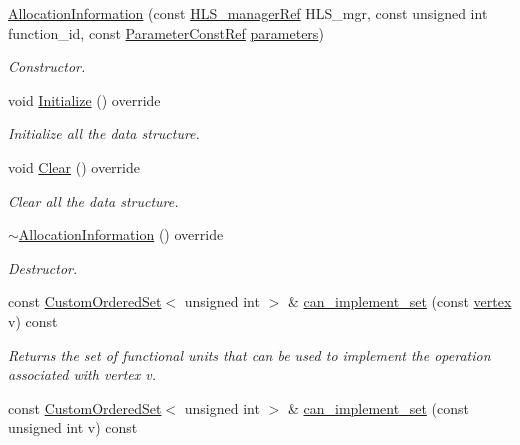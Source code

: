 \begin{DoxyCompactItemize}
\item 
\hyperlink{classAllocationInformation_a234060bfc4ac6212fd26241260ffc1d8}{Allocation\+Information} (const \hyperlink{hls__manager_8hpp_acd3842b8589fe52c08fc0b2fcc813bfe}{H\+L\+S\+\_\+manager\+Ref} H\+L\+S\+\_\+mgr, const unsigned int function\+\_\+id, const \hyperlink{Parameter_8hpp_a37841774a6fcb479b597fdf8955eb4ea}{Parameter\+Const\+Ref} \hyperlink{classIntermediateRepresentation_a1dec82655a3ccf5023a1d3bb9805ce8c}{parameters})
\begin{DoxyCompactList}\small\item\em Constructor. \end{DoxyCompactList}\item 
void \hyperlink{classAllocationInformation_ad1263fb5b76f2dd97daacfcf3012f3e4}{Initialize} () override
\begin{DoxyCompactList}\small\item\em Initialize all the data structure. \end{DoxyCompactList}\item 
void \hyperlink{classAllocationInformation_a2a8dda2a075950424083d9aff01267fe}{Clear} () override
\begin{DoxyCompactList}\small\item\em Clear all the data structure. \end{DoxyCompactList}\item 
\hyperlink{classAllocationInformation_a102ad3015bf873da2b0c35280849f727}{$\sim$\+Allocation\+Information} () override
\begin{DoxyCompactList}\small\item\em Destructor. \end{DoxyCompactList}\item 
const \hyperlink{classCustomOrderedSet}{Custom\+Ordered\+Set}$<$ unsigned int $>$ \& \hyperlink{classAllocationInformation_a070bb1c2f0116dd33cca59346ee57372}{can\+\_\+implement\+\_\+set} (const \hyperlink{graph_8hpp_abefdcf0544e601805af44eca032cca14}{vertex} v) const
\begin{DoxyCompactList}\small\item\em Returns the set of functional units that can be used to implement the operation associated with vertex v. \end{DoxyCompactList}\item 
const \hyperlink{classCustomOrderedSet}{Custom\+Ordered\+Set}$<$ unsigned int $>$ \& \hyperlink{classAllocationInformation_aa232c85d830198cd536e5c38135f75b8}{can\+\_\+implement\+\_\+set} (const unsigned int v) const

\end{DoxyCompactItemize}
